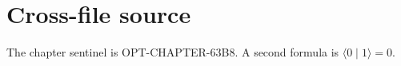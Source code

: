 \section{Cross-file source}
The chapter sentinel is OPT-CHAPTER-63B8.
A second formula is $\langle 0\mid 1\rangle=0$.
